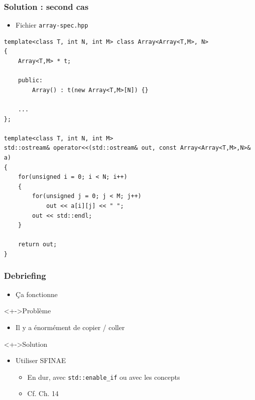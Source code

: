 \begin{frame}[containsverbatim]
\frametitle{Solution : second cas}
\begin{itemize}
\item Fichier \texttt{array-spec.hpp}
\end{itemize}
\begin{lstlisting}
template<class T, int N, int M> class Array<Array<T,M>, N>
{
	Array<T,M> * t;       
    
	public:
		Array() : t(new Array<T,M>[N]) {}
		
	...
};

template<class T, int N, int M>
std::ostream& operator<<(std::ostream& out, const Array<Array<T,M>,N>& a)
{
    for(unsigned i = 0; i < N; i++)
    {
        for(unsigned j = 0; j < M; j++)
            out << a[i][j] << " ";    
        out << std::endl;
    }

    return out;
}
\end{lstlisting}
\end{frame}

\begin{frame}
\frametitle{Debriefing}
\begin{itemize}[<+->]
\item Ça fonctionne
\end{itemize}
\begin{alertblock}<+->{Problème}
	\begin{itemize}[<+->]
	\item Il y a énormément de copier / coller
	\end{itemize}
\end{alertblock}
\begin{block}<+->{Solution}
	\begin{itemize}[<+->]
	\item Utiliser SFINAE
		\begin{itemize}
		\item En dur, avec \texttt{std::enable\_if} ou avec les concepts
		\item Cf. Ch. 14
		\end{itemize}
	\end{itemize}
\end{block}
\end{frame}

